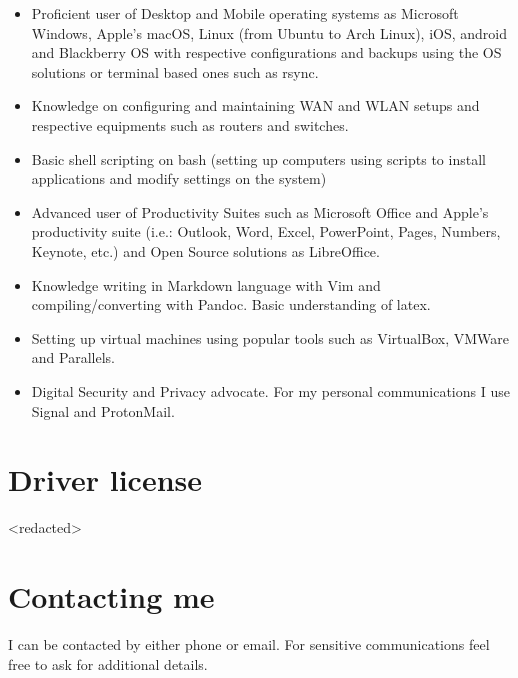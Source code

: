 \documentclass{article}
\begin{document}
\begin{itemize}
\setlength\itemsep{0em}

\item Proficient user of Desktop and Mobile operating systems as Microsoft Windows, Apple's macOS, Linux (from Ubuntu to Arch Linux), iOS, android and Blackberry OS with respective configurations and backups using the OS solutions or terminal based ones such as rsync.

\item Knowledge on configuring and maintaining WAN and WLAN setups and respective equipments such as routers and switches.

\item Basic shell scripting on bash (setting up computers using scripts to install applications and modify settings on the system)

\item Advanced user of Productivity Suites such as Microsoft Office and Apple's productivity suite (i.e.: Outlook, Word, Excel, PowerPoint, Pages, Numbers, Keynote, etc.) and Open Source solutions as LibreOffice.

\item Knowledge writing in Markdown language with Vim and compiling/converting with Pandoc. Basic understanding of latex.

\item Setting up virtual machines using popular tools such as VirtualBox, VMWare and Parallels.

\item Digital Security and Privacy advocate. For my personal communications I use Signal and ProtonMail.

\end{itemize}

\section{Driver license}

<redacted>

\section{Contacting me}

I can be contacted by either phone or email. For sensitive communications feel free to ask for additional details.
\end{document}
